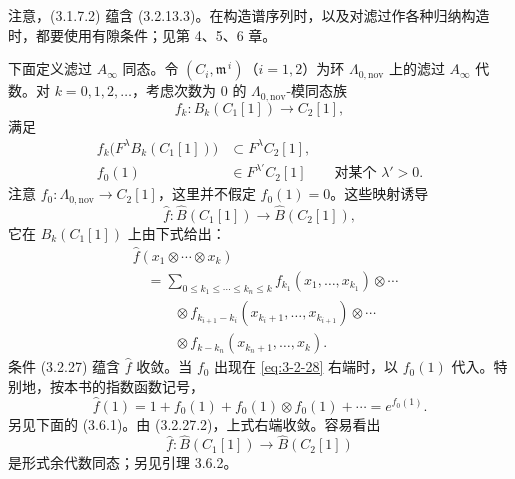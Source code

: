 注意，(3.1.7.2) 蕴含 (3.2.13.3)。在构造谱序列时，以及对滤过作各种归纳构造
时，都要使用有隙条件；见第 4、5、6 章。

下面定义滤过 $A_\infty$ 同态。令
$(C_i,\mathfrak m^{\,i})$（$i=1,2$）为环
$\Lambda_{0,\mathrm{nov}}$ 上的滤过 $A_\infty$ 代数。对
$k=0,1,2,\ldots$，考虑次数为 $0$ 的 $\Lambda_{0,\mathrm{nov}}$-模同态族
\[
  f_k\colon B_k(C_1[1])\longrightarrow C_2[1],
\]
满足
\begin{align}
  f_k\bigl(F^\lambda B_k(C_1[1])\bigr)
  &\subset F^\lambda C_2[1],
  \tag{3.2.27.1}\label{eq:3-2-27-1}\\
  f_0(1)&\in F^{\lambda'}C_2[1]
  \qquad\text{对某个 }\lambda'>0.
  \tag{3.2.27.2}\label{eq:3-2-27-2}
\end{align}
注意 $f_0\colon\Lambda_{0,\mathrm{nov}}\to C_2[1]$，这里并不假定
$f_0(1)=0$。这些映射诱导
\[
  \widehat f\colon\widehat B(C_1[1])\longrightarrow\widehat B(C_2[1]),
\]
它在 $B_k(C_1[1])$ 上由下式给出：
\begin{equation}
\begin{aligned}
  &\widehat f(x_1\otimes\cdots\otimes x_k)\\
  &\quad={}
  \sum_{0\leq k_1\leq\cdots\leq k_n\leq k}
  f_{k_1}(x_1,\ldots,x_{k_1})\otimes\cdots\\
  &\qquad\quad{}\otimes
  f_{k_{i+1}-k_i}(x_{k_i+1},\ldots,x_{k_{i+1}})\otimes\cdots\\
  &\qquad\quad{}\otimes
  f_{k-k_n}(x_{k_n+1},\ldots,x_k).
\end{aligned}
\tag{3.2.28}\label{eq:3-2-28}
\end{equation}
条件 (3.2.27) 蕴含 $\widehat f$ 收敛。当 $f_0$ 出现在
\eqref{eq:3-2-28} 右端时，以 $f_0(1)$ 代入。特别地，按本书的指数函数记号，
\[
  \widehat f(1)
  =1+f_0(1)+f_0(1)\otimes f_0(1)+\cdots=e^{f_0(1)}.
\]
另见下面的 (3.6.1)。由 (3.2.27.2)，上式右端收敛。容易看出
\[
  \widehat f\colon\widehat B(C_1[1])\longrightarrow\widehat B(C_2[1])
\]
是形式余代数同态；另见引理 3.6.2。

